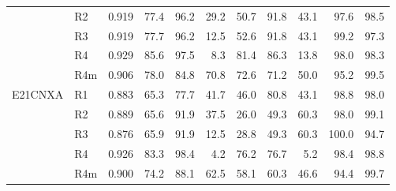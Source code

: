\begin{table}[h]
\begin{tabular}{@{}llrrrrrrrrr@{}}
 & R2 & 0.919 & 77.4 & 96.2 & 29.2 & 50.7 & 91.8 & 43.1 & 97.6 & 98.5 \\
 & R3 & 0.919 & 77.7 & 96.2 & 12.5 & 52.6 & 91.8 & 43.1 & 99.2 & 97.3 \\
 & R4 & 0.929 & 85.6 & 97.5 & 8.3 & 81.4 & 86.3 & 13.8 & 98.0 & 98.3 \\
 & R4m & 0.906 & 78.0 & 84.8 & 70.8 & 72.6 & 71.2 & 50.0 & 95.2 & 99.5 \\
\addlinespace
E21CNXA & R1 & 0.883 & 65.3 & 77.7 & 41.7 & 46.0 & 80.8 & 43.1 & 98.8 & 98.0 \\
 & R2 & 0.889 & 65.6 & 91.9 & 37.5 & 26.0 & 49.3 & 60.3 & 98.0 & 99.1 \\
 & R3 & 0.876 & 65.9 & 91.9 & 12.5 & 28.8 & 49.3 & 60.3 & 100.0 & 94.7 \\
 & R4 & 0.926 & 83.3 & 98.4 & 4.2 & 76.2 & 76.7 & 5.2 & 98.4 & 98.8 \\
 & R4m & 0.900 & 74.2 & 88.1 & 62.5 & 58.1 & 60.3 & 46.6 & 94.4 & 99.7 \\
\bottomrule
\end{tabular}
\end{table}

